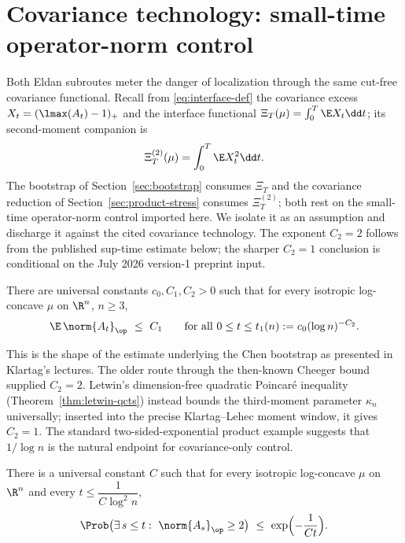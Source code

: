 \documentclass[../../main.tex]{subfiles}
\begin{document}
\section{Covariance technology: small-time operator-norm control}
\label{sec:covariance-tech}

Both Eldan subroutes meter the danger of localization through the same cut-free covariance
functional.
Recall from \eqref{eq:interface-def} the covariance excess $X_t=(\lmax(A_t)-1)_+$ and the
interface functional $\Xi_T(\mu)=\int_0^T\E X_t\dd t$; its second-moment companion is
\begin{equation}\label{eq:Xi2-def}
  \Xi^{(2)}_T(\mu)=\int_0^T\E X_t^2\dd t .
\end{equation}
The bootstrap of Section~\ref{sec:bootstrap} consumes $\Xi_T$ and the covariance reduction of
Section~\ref{sec:product-stress} consumes $\Xi^{(2)}_T$; both rest on the small-time
operator-norm control imported here. We isolate it as an assumption and discharge it against
the cited covariance technology. The exponent $C_2=2$ follows from the published sup-time
estimate below; the sharper $C_2=1$ conclusion is conditional on the July 2026 version-1
preprint input.

\begin{assumption}
\label{hyp:KI}
There are universal constants $c_0,C_1,C_2>0$ such that for every isotropic log-concave $\mu$ on
$\R^n$, $n\ge3$,
\[
  \E\,\norm{A_t}_\op\ \le\ C_1
  \qquad\text{for all }0\le t\le t_1(n):=c_0(\log n)^{-C_2}.
\]
\end{assumption}

\noindent
This is the shape of the estimate underlying the Chen bootstrap as presented in Klartag's
lectures. The older route through the then-known Cheeger bound supplied $C_2=2$. Letwin's
dimension-free quadratic Poincar\'e inequality (Theorem~\ref{thm:letwin-qcts}) instead bounds the
third-moment parameter $\kappa_n$ universally; inserted into the precise Klartag--Lehec moment
window, it gives $C_2=1$. The standard two-sided-exponential product example suggests that
$1/\log n$ is the natural endpoint for covariance-only control.

\begin{theorem}
\label{thm:KL-window}
There is a universal constant $C$ such that for every isotropic log-concave $\mu$ on $\R^n$
and every $t\le\dfrac1{C\log^2n}$,
\[
  \Prob\bigl(\exists\,s\le t:\ \norm{A_s}_\op\ge2\bigr)\ \le\ \exp\Bigl(-\frac1{Ct}\Bigr).
\]
\end{theorem}
\end{document}
